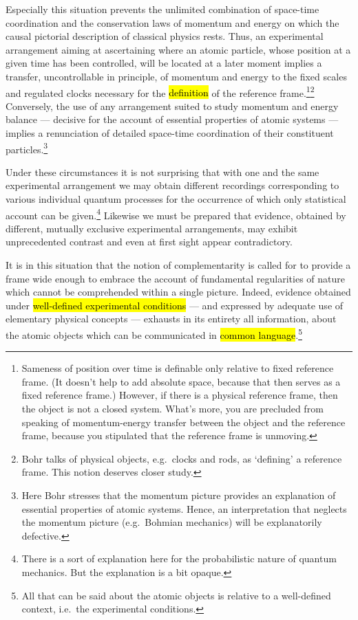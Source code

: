 \documentclass{tufte-handout}
\begin{document}
Especially this situation prevents the unlimited combination of
space-time coordination and the conservation laws of momentum and
energy on which the causal pictorial description of classical physics
rests. Thus, an experimental arrangement aiming at ascertaining where
an atomic particle, whose position at a given time has been
controlled, will be located at a later moment implies a transfer,
uncontrollable in principle, of momentum and energy to the fixed
scales and regulated clocks necessary for the \hl{definition} of the
reference frame.\footnote{Sameness of position over time is definable
  only relative to fixed reference frame. (It doesn't help to add
  absolute space, because that then serves as a fixed reference
  frame.) However, if there is a physical reference frame, then the
  object is not a closed system. What's more, you are precluded from
  speaking of momentum-energy transfer between the object and the
  reference frame, because you stipulated that the reference frame is
  unmoving.}\footnote{Bohr talks of physical objects, e.g.\ clocks and
  rods, as `defining' a reference frame. This notion deserves closer
  study.}  Conversely, the use of any arrangement suited to study
momentum and energy balance --- decisive for the account of essential
properties of atomic systems --- implies a renunciation of detailed
space-time coordination of their constituent particles.\footnote{Here
  Bohr stresses that the momentum picture provides an explanation of
  essential properties of atomic systems. Hence, an interpretation
  that neglects the momentum picture (e.g.\ Bohmian mechanics) will be
  explanatorily defective.}

Under these circumstances it is not surprising that with one and the
same experimental arrangement we may obtain different recordings
corresponding to various individual quantum processes for the
occurrence of which only statistical account can be
given.\footnote{There is a sort of explanation here for the
  probabilistic nature of quantum mechanics. But the explanation is a
  bit opaque.} Likewise we must be prepared that evidence, obtained by
different, mutually exclusive experimental arrangements, may exhibit
unprecedented contrast and even at first sight appear contradictory.

It is in this situation that the notion of complementarity is called
for to provide a frame wide enough to embrace the account of
fundamental regularities of nature which cannot be comprehended within
a single picture. Indeed, evidence obtained under \hl{well-defined
  experimental conditions} --- and expressed by adequate use of
elementary physical concepts --- exhausts in its entirety all
information, about the atomic objects which can be communicated in
\hl{common language}.\footnote{All that can be said about the atomic
  objects is relative to a well-defined context, i.e.\ the
  experimental conditions.}
\end{document}
